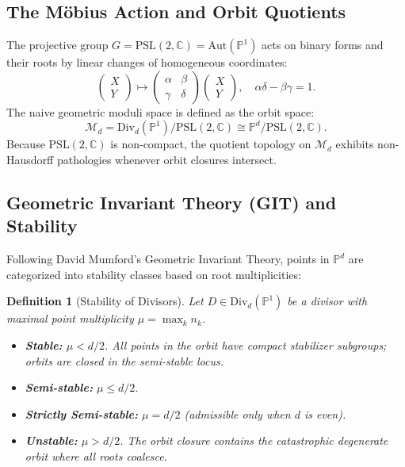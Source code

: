\documentclass[11pt,a4paper]{article}
\newtheorem{definition}{Definition}
\begin{document}
\subsection{The M\"obius Action and Orbit Quotients}
The projective group $G = \mathrm{PSL}(2, \mathbb{C}) = \mathrm{Aut}(\mathbb{P}^1)$ acts on binary forms and their roots by linear changes of homogeneous coordinates:
\begin{equation}
\begin{pmatrix} X \\ Y \end{pmatrix} \mapsto \begin{pmatrix} \alpha & \beta \\ \gamma & \delta \end{pmatrix} \begin{pmatrix} X \\ Y \end{pmatrix}, \quad \alpha\delta - \beta\gamma = 1.
\end{equation}
The naive geometric moduli space is defined as the orbit space:
\begin{equation}
\mathcal{M}_d = \mathrm{Div}_d(\mathbb{P}^1) / \mathrm{PSL}(2, \mathbb{C}) \cong \mathbb{P}^d / \mathrm{PSL}(2, \mathbb{C}).
\end{equation}
Because $\mathrm{PSL}(2, \mathbb{C})$ is non-compact, the quotient topology on $\mathcal{M}_d$ exhibits non-Hausdorff pathologies whenever orbit closures intersect.

\subsection{Geometric Invariant Theory (GIT) and Stability}
Following David Mumford's Geometric Invariant Theory, points in $\mathbb{P}^d$ are categorized into stability classes based on root multiplicities:
\begin{definition}[Stability of Divisors]
Let $D \in \mathrm{Div}_d(\mathbb{P}^1)$ be a divisor with maximal point multiplicity $\mu = \max_k n_k$.
\begin{itemize}
    \item \textbf{Stable:} $\mu < d/2$. All points in the orbit have compact stabilizer subgroups; orbits are closed in the semi-stable locus.
    \item \textbf{Semi-stable:} $\mu \le d/2$.
    \item \textbf{Strictly Semi-stable:} $\mu = d/2$ (admissible only when $d$ is even).
    \item \textbf{Unstable:} $\mu > d/2$. The orbit closure contains the catastrophic degenerate orbit where all roots coalesce.
\end{itemize}
\end{definition}
\end{document}
